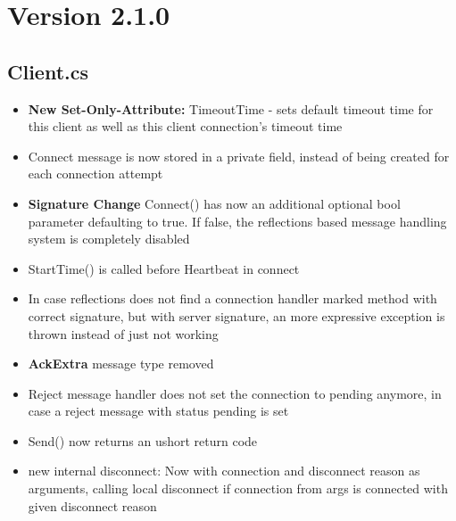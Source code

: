 \renewcommand{\namespace}{\nsChangelogTwoOneZero}

\chapter{Version 2.1.0}

\section{Client.cs}

\begin{itemize}
	\item \textbf{New Set-Only-Attribute:} TimeoutTime - sets default timeout time for this client as well as this client connection's timeout time
	\item Connect message is now stored in a private field, instead of being created for each connection attempt
	\item \textbf{Signature Change} Connect() has now an additional optional bool parameter defaulting to true. If false, the reflections based message handling system is completely disabled
	\item StartTime() is called before Heartbeat in connect
	\item In case reflections does not find a connection handler marked method with correct signature, but with server signature, an more expressive exception is thrown instead of just not working
	\item \textbf{AckExtra} message type removed
	\item Reject message handler does not set the connection to pending anymore, in case a reject message with status pending is set
	\item Send() now returns an ushort return code
	\item new internal disconnect: Now with connection and disconnect reason as arguments, calling local disconnect if connection from args is connected with given disconnect reason
\end{itemize}